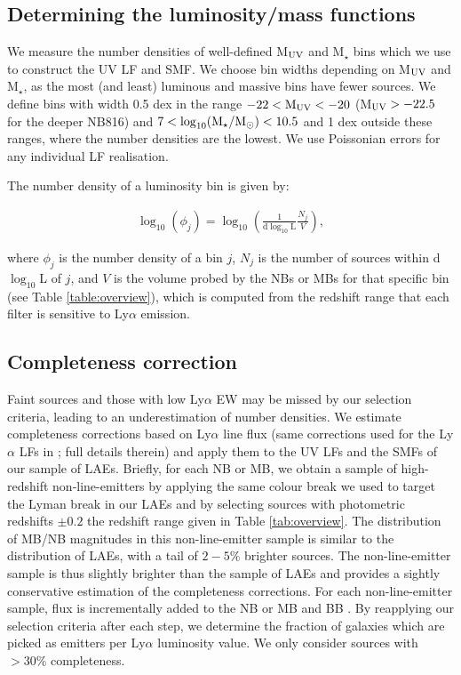 \documentclass[a4paper,fleqn,usenatbib]{mnras}
\begin{document}
\subsection{Determining the luminosity/mass functions}

We measure the number densities of well-defined M$_{\rm UV}$ and M$_\star$ bins which we use to construct the UV LF and SMF. We choose bin widths depending on M$_{\rm UV}$ and M$_\star$, as the most (and least) luminous and massive bins have fewer sources. We define bins with width 0.5 dex in the range $-22<{\rm M}_{\rm UV}<-20$ (M$_{\rm UV}>-22.5$ for the deeper NB816) and $7<\log_{10} ({\rm M_\star/M_\odot})<10.5$ and 1 dex outside these ranges, where the number densities are the lowest.  We use Poissonian errors for any individual LF realisation.

The number density of a luminosity bin is given by:

\begin{eqnarray}
\log_{10}(\phi_j)=\log_{10}\left(\frac{1}{\mathrm{d}\log_{10}\mathrm{L}}\frac{N_j}{V}\right),
\label{eq:bins}
\end{eqnarray}

\noindent where $\phi_j$ is the number density of a bin $j$, $N_j$ is the number of sources within d$\log_{10}$L of $j$, and $V$ is the volume probed by the NBs or MBs for that specific bin (see Table \ref{table:overview}), which is computed from the redshift range that each filter is sensitive to Ly$\alpha$ emission.
 
\subsection{Completeness correction} \label{subsec:completeness}

Faint sources and those with low Ly$\alpha$ EW may be missed by our selection criteria, leading to an underestimation of number densities. We estimate completeness corrections based on Ly$\alpha$ line flux (same corrections used for the Ly$\alpha$ LFs in \citealt{Sobral2018}; full details therein) and apply them to the UV LFs and the SMFs of our sample of LAEs. Briefly, for each NB or MB, we obtain a sample of high-redshift non-line-emitters by applying the same colour break we used to target the Lyman break in our LAEs and by selecting sources with photometric redshifts \citep[obtained from][]{Laigle2016} $\pm0.2$ the redshift range given in Table \ref{tab:overview}. The distribution of MB/NB magnitudes in this non-line-emitter sample is similar to the distribution of LAEs, with a tail of $2-5\%$ brighter sources. The non-line-emitter sample is thus slightly brighter than the sample of LAEs and provides a sightly conservative estimation of the completeness corrections. For each non-line-emitter sample, flux is incrementally added to the NB or MB and BB \cite[see][Table 3 therein]{Sobral2018}. By reapplying our selection criteria after each step, we determine the fraction of galaxies which are picked as emitters per Ly$\alpha$ luminosity value.  We only consider sources with $>30\%$ completeness.
\end{document}
